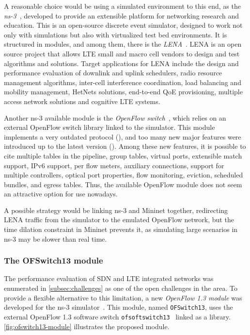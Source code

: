A reasonable choice would be using a simulated environment to this end, as the
\emph{\acf{ns-3}}~\cite{ns3}, developed to provide an extensible platform for
networking research and education. This is an open-source discrete event
simulator, designed to work not only with simulations but also with virtualized
test bed environments. It is structured in modules, and among them, there is
the \emph{\ac{LENA}}~\cite{lena}. \ac{LENA} is an open source project that
allows \ac{LTE} small and macro cell vendors to design and test algorithms and
solutions. Target applications for \ac{LENA} include the design and performance
evaluation of downlink and uplink schedulers, radio resource management
algorithms, inter-cell interference coordination, load balancing and mobility
management, \acp{HetNet} solutions, end-to-end \ac{QoE} provisioning, multiple
access network solutions and cognitive \ac{LTE} systems.

Another \ac{ns-3} available module is the \emph{OpenFlow
switch}~\cite{ns3of2010}, which relies on an external OpenFlow switch library
linked to the simulator. This module implements a very outdated protocol
(\citet{ofs089}), and too many new major features were introduced up to the
latest version (\citet{ofs151}). Among these new features, it is possible to
cite multiple tables in the pipeline, group tables, virtual ports, extensible
match support, \acs{IP}v6 support, per flow meters, auxiliary connections,
support for multiple controllers, optical port properties, flow monitoring,
eviction, scheduled bundles, and egress tables. Thus, the available OpenFlow
module does not seem an attractive option for use nowadays.

A possible strategy would be linking \ac{ns-3} and Mininet together,
redirecting \ac{LENA} traffic from the simulator to the emulated OpenFlow
network, but the time dilation constraint in Mininet prevents it, as simulating
large scenarios in \ac{ns-3} may be slower than real time.

\subsubsection{The OFSwitch13 module}
\label{subsec:ofswitch13}

The performance evaluation of \ac{SDN} and \ac{LTE} integrated networks was
enumerated in \autoref{subsec:challenges} as one of the open challenges in the
area. To provide a flexible alternative to this limitation, a new
\emph{OpenFlow 1.3 module} was developed for the \ac{ns-3}
simulator~\cite{ofswitch13, Chaves2015}. This module, named
\texttt{OFSwitch13}, uses the external OpenFlow 1.3 software switch
\texttt{ofsoftswitch13}~\cite{ofsoftswich13} linked as a library.
\autoref{fig:ofswitch13-module} illustrates the proposed module.

